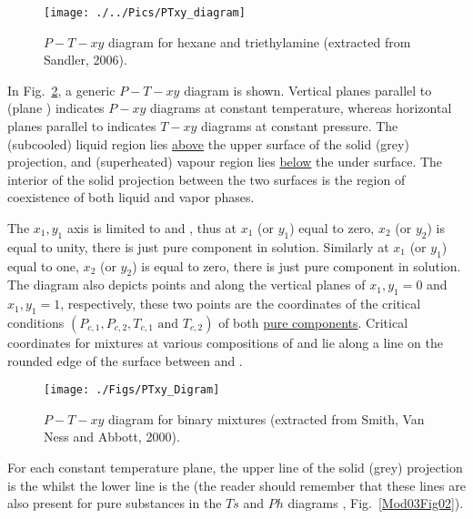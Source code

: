       \begin{figure}[h]
         \begin{center}
           \texttt{[image: ./../Pics/PTxy\_diagram]}
           \vspace{-.1cm}\caption{$P-T-xy$ diagram for hexane and triethylamine (extracted from Sandler, 2006).}\label{Mod04Fig01}
         \end{center}
       \end{figure}

In Fig.~\ref{Mod04Fig02}, a generic $P-T-xy$ diagram is shown. Vertical planes parallel to  (\eg plane ) indicates $P-xy$ diagrams at constant temperature, whereas horizontal planes parallel to  indicates $T-xy$ diagrams at constant pressure. The (subcooled) liquid region lies \underline{above} the upper surface of the solid (grey) projection, and (superheated) vapour region lies \underline{below} the under surface. The interior of the solid projection between the two surfaces is the region of coexistence of both liquid and vapor phases. 

The $x_{1},y_{1}$ axis is limited to  and , thus at $x_{1}$ (or $y_{1}$) equal to zero, $x_{2}$ (or $y_{2}$) is equal to unity, \ie there is just pure component  in solution. Similarly at $x_{1}$ (or $y_{1}$) equal to one, $x_{2}$ (or $y_{2}$) is equal to zero, \ie there is just pure component  in solution. The diagram also depicts points  and  along the vertical planes of $x_{1},y_{1}=0$ and $x_{1},y_{1}=1$, respectively, these two points are the coordinates of the critical conditions $\left(P_{c,1}, P_{c,2}, T_{c,1} \text{ and } T_{c,2}\right)$ of both \underline{pure components}. Critical coordinates for mixtures at various compositions of  and  lie along a line on the rounded edge of the surface between  and .
      \begin{figure}[h] 
         \begin{center}
             \texttt{[image: ./Figs/PTxy\_Digram]} 
             \vspace{-.1cm}\caption{$P-T-xy$ diagram for binary mixtures (extracted from Smith, Van Ness and Abbott, 2000).}\label{Mod04Fig02}
         \end{center}
       \end{figure}
For each constant temperature plane, the upper line of the solid (grey) projection is the  whilst the lower line is the  (the reader should remember that these lines are also present for pure substances in the $Ts$ and $Ph$ diagrams , Fig.~\ref{Mod03Fig02}).

